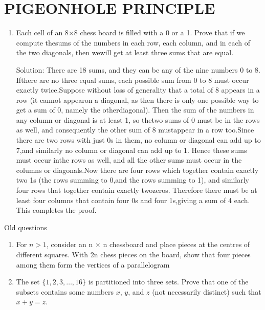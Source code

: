 \documentclass[12pt]{article}
\begin{document}
\section{PIGEONHOLE PRINCIPLE}
\begin{enumerate}
    \item Each cell of an 8×8 chess board is filled with a 0 or a 1. Prove that if we compute thesums of the numbers in each row, each column, and in each of the two diagonals, then wewill get at least three sums that are equal.

    \begin{center}
    Solution: There are 18 sums, and they can be any of the nine numbers 0 to 8. Ifthere are no three equal sums, each possible sum from 0 to 8 must occur exactly twice.Suppose without loss of generality that a total of 8 appears in a row (it cannot appearon a diagonal, as then there is only one possible way to get a sum of 0, namely the otherdiagonal). Then the sum of the numbers in any column or diagonal is at least 1, so thetwo sums of 0 must be in the rows as well, and consequently the other sum of 8 mustappear in a row too.Since there are two rows with just 0s in them, no column or diagonal can add up to 7,and similarly no column or diagonal can add up to 1. Hence these sums must occur inthe rows as well, and all the other sums must occur in the columns or diagonals.Now there are four rows which together contain exactly two 1s (the rows summing to 0,and the rows summing to 1), and similarly four rows that together contain exactly twozeros. Therefore there must be at least four columns that contain four 0s and four 1s,giving a sum of 4 each. This completes the proof.
    \end{center}

    
    

\end{enumerate}
Old questions
\begin{enumerate}
    \item For $n>1$, consider an n × n chessboard and place pieces at the centres of different squares. With 2n chess pieces on the board, show that four pieces among them form the vertices of a parallelogram
    
    \item The set $\{1,2,3,\dots,16\}$ is partitioned into three sets. Prove that one of the subsets contains some numbers $x$, $y$, and $z$ (not necessarily distinct) such that $x+y=z$.
\end{enumerate}
\end{document}
